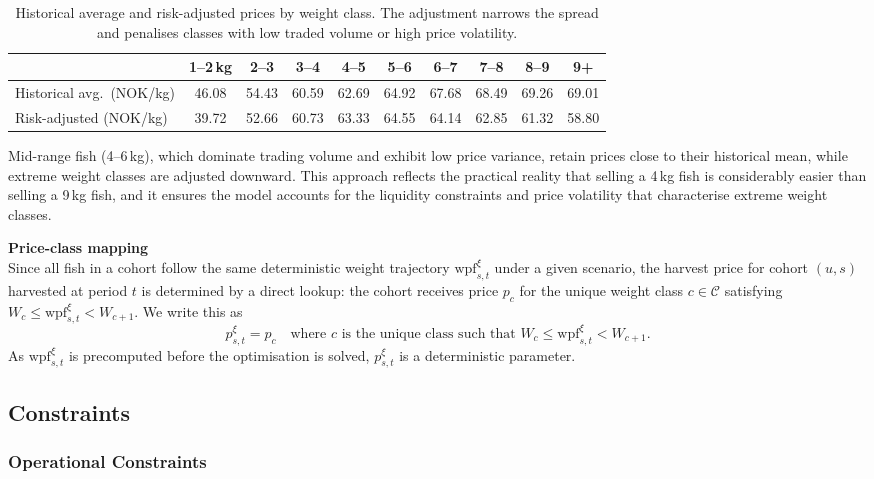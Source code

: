 \documentclass[12pt,a4paper]{article}
\begin{document}
\begin{table}[ht]
\centering
\small
\begin{tabular}{l*{9}{c}}
\toprule
 & 1--2\,kg & 2--3 & 3--4 & 4--5 & 5--6 & 6--7 & 7--8 & 8--9 & 9+ \\
\midrule
Historical avg.\ (NOK/kg) & 46.08 & 54.43 & 60.59 & 62.69 & 64.92 & 67.68 & 68.49 & 69.26 & 69.01 \\
Risk-adjusted (NOK/kg) & 39.72 & 52.66 & 60.73 & 63.33 & 64.55 & 64.14 & 62.85 & 61.32 & 58.80 \\
\bottomrule
\end{tabular}
\caption{Historical average and risk-adjusted prices by weight class. The adjustment narrows the spread and penalises classes with low traded volume or high price volatility.}
\label{tab:price_adjustment}
\end{table}
 
Mid-range fish (4--6\,kg), which dominate trading volume and exhibit low price variance, retain prices close to their historical mean, while extreme weight classes are adjusted downward. This approach reflects the practical reality that selling a 4\,kg fish is considerably easier than selling a 9\,kg fish, and it ensures the model accounts for the liquidity constraints and price volatility that characterise extreme weight classes.
 
\noindent \textbf{Price-class mapping} \\
Since all fish in a cohort follow the same deterministic weight trajectory $\mathrm{wpf}^{\xi}_{s,t}$ under a given scenario, the harvest price for cohort $(u,s)$ harvested at period $t$ is determined by a direct lookup: the cohort receives price $p_c$ for the unique weight class $c \in \mathcal{C}$ satisfying $W_c \leq \mathrm{wpf}^{\xi}_{s,t} < W_{c+1}$. We write this as
\begin{equation}
    p^{\xi}_{s,t} = p_c
    \quad \text{where } c \text{ is the unique class such that }
    W_c \leq \mathrm{wpf}^{\xi}_{s,t} < W_{c+1}.
\end{equation}
As $\mathrm{wpf}^{\xi}_{s,t}$ is precomputed before the optimisation is solved, $p^{\xi}_{s,t}$ is a deterministic parameter.
 
 
\subsection{Constraints}
\subsubsection{Operational Constraints}
\label{sec:operational}
 
\end{document}
